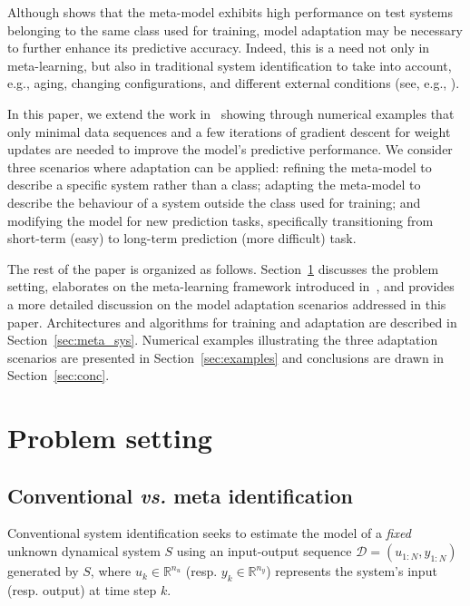 \documentclass{ifacconf}
\newcommand{\sys}{S}
\newcommand{\D}{\mathcal{D}}
\newcommand{\nsamp}{N}
\begin{document}
Although \citet{forgione2023context} shows that the meta-model  exhibits high performance on test systems belonging to the same class used for training, model adaptation may be necessary to further enhance its predictive accuracy.  
Indeed, this is a need not only in meta-learning, but also in traditional system identification to take into account, e.g., aging, changing configurations, and different external conditions (see, e.g., \citet{pozzoli2020tustin, forgione2023adaptation}).


In this paper, we extend the work in~\citet{forgione2023context} showing through numerical examples that only minimal data sequences and a few iterations of gradient descent for weight updates are needed to improve the model's predictive performance. We consider three  scenarios where adaptation can be applied: refining the meta-model to describe a specific system rather than a class; adapting the meta-model to describe the behaviour of a system outside the class used for training; and modifying the model for new prediction tasks, specifically transitioning from short-term (easy) to long-term prediction (more difficult) task.

The rest of the paper is organized as follows. Section~\ref{sec:prob_Set} discusses the problem setting, elaborates on the meta-learning framework introduced in~\citet{forgione2023context}, and provides a more detailed discussion on the model adaptation scenarios addressed in this paper. Architectures and algorithms for training and adaptation are described in Section~\ref{sec:meta_sys}. Numerical examples illustrating the three  adaptation scenarios are presented in Section~\ref{sec:examples} and conclusions are drawn in Section~\ref{sec:conc}.










\section{Problem setting} \label{sec:prob_Set}


\subsection{Conventional   \emph{vs.} meta identification}


Conventional system identification seeks to estimate the model of a \emph{fixed} unknown dynamical system $\sys$ using an input-output sequence $\D = (u_{1:\nsamp}, y_{1:\nsamp})$ generated by $\sys$, where $u_k \in \mathbb{R}^{n_u}$ (resp. $y_k  \in \mathbb{R}^{n_y}$) represents the system's input (resp. output) at time step $k$.
\end{document}
